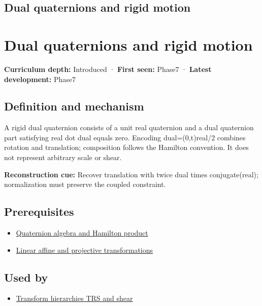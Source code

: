 \hypertarget{appendix-d1ea57347893}{}
\section*{Dual quaternions and rigid motion}
\chapter{Dual quaternions and rigid motion}\label{appendix-d1ea57347893-dual-quaternions-and-rigid-motion}

\textbf{Curriculum depth:} Introduced · \textbf{First seen:} Phase7 · \textbf{Latest development:} Phase7

\section{Definition and mechanism}\label{appendix-d1ea57347893-definition-and-mechanism}

A rigid dual quaternion consists of a unit real quaternion and a dual quaternion part satisfying real dot dual equals zero. Encoding dual=(0,t)real/2 combines rotation and translation; composition follows the Hamilton convention. It does not represent arbitrary scale or shear.

\textbf{Reconstruction cue:} Recover translation with twice dual times conjugate(real); normalization must preserve the coupled constraint.

\section{Prerequisites}\label{appendix-d1ea57347893-prerequisites}

\begin{itemize}
\tightlist
\item
  \hyperref[appendix-965d9260eeab]{Quaternion algebra and Hamilton product}
\item
  \hyperref[appendix-0bf0ca73f735]{Linear affine and projective transformations}
\end{itemize}

\section{Used by}\label{appendix-d1ea57347893-used-by}

\begin{itemize}
\tightlist
\item
  \hyperref[appendix-292c061cd47c]{Transform hierarchies TRS and shear}
\end{itemize}

